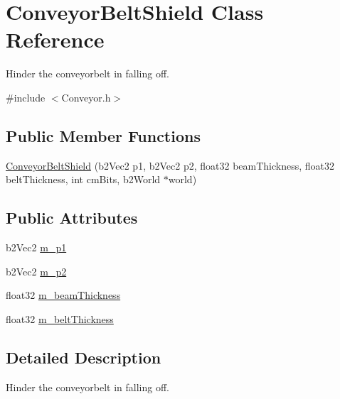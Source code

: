 \hypertarget{classConveyorBeltShield}{\section{Conveyor\-Belt\-Shield Class Reference}
\label{classConveyorBeltShield}
}


Hinder the conveyorbelt in falling off.  




{\ttfamily \#include $<$Conveyor.\-h$>$}

\subsection*{Public Member Functions}
\begin{DoxyCompactItemize}
\item 
\hyperlink{classConveyorBeltShield_a814f92c11fe70adfc3b6f033357ebf3a}{Conveyor\-Belt\-Shield} (b2\-Vec2 p1, b2\-Vec2 p2, float32 beam\-Thickness, float32 belt\-Thickness, int cm\-Bits, b2\-World $\ast$world)
\end{DoxyCompactItemize}
\subsection*{Public Attributes}
\begin{DoxyCompactItemize}
\item 
b2\-Vec2 \hyperlink{classConveyorBeltShield_a28e34cf663b048519e8af9412b42c638}{m\-\_\-p1}
\item 
b2\-Vec2 \hyperlink{classConveyorBeltShield_a2bc6d812e1e50d7be3f7ddb97b29f0dd}{m\-\_\-p2}
\item 
float32 \hyperlink{classConveyorBeltShield_a026153ef70d96c0e835861467cc1a02c}{m\-\_\-beam\-Thickness}
\item 
float32 \hyperlink{classConveyorBeltShield_a793a55bd4b34b9e2a6c89b457373f01d}{m\-\_\-belt\-Thickness}
\end{DoxyCompactItemize}


\subsection{Detailed Description}
Hinder the conveyorbelt in falling off. 

